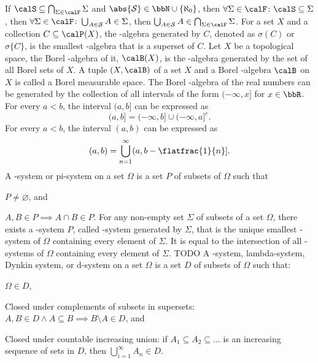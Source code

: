 \documentclass[a4paper,12pt]{article}
\begin{document}
If $\calS\subseteq\bigcap_{\Sigma\in\calF}\Sigma$ and $\abs{\mathcal{S}}\in\bbN\cup\{\aleph_0\}$, then $\forall\Sigma\in\calF\colon\calS\subseteq\Sigma$, then $\forall\Sigma\in\calF\colon\bigcup_{A\in\mathcal{S}}A\in\Sigma$, then $\bigcup_{A\in\mathcal{S}}A\in\bigcap_{\Sigma\in\calF}\Sigma$.
\epr
{}
For a set $X$ and a collection $C\subseteq \calP(X)$, the \text{\textsigma}-algebra generated by $C$, denoted as $\sigma(C)$ or $\sigma\{C\}$, is the smallest \text{\textsigma}-algebra that is a superset of $C$.
Let $X$ be a topological space, the Borel \text{\textsigma}-algebra of it, $\calB(X)$, is the \text{\textsigma}-algebra generated by the set of all Borel sets of $X$.
A tuple $(X,\calB)$ of a set $X$ and a Borel \text{\textsigma}-algebra $\calB$ on $X$ is called a Borel measurable space.
The Borel \text{\textsigma}-algebra of the real numbers can be generated by the collection of all intervals of the form $(-\infty,x]$ for $x\in\bbR$.
\bpr
For every $a<b$, the interval $(a,b]$ can be expressed as
\[(a,b]=(-\infty,b]\cup(-\infty,a]^c.\]
For every $a<b$, the interval $(a,b)$ can be expressed as
\[(a,b)=\bigcup_{n=1}^{\infty}(a,b-\flatfrac{1}{n}].\]
\epr
{}
A \textpi-system or pi-system on a set $\Omega$ is a set $P$ of subsets of $\Omega$ such that
\bit
\item $P\ne\varnothing$, and
\item $A,B\in P\implies A\cap B\in P$.
\eit
{}
For any non-empty set $\Sigma$ of subsets of a set $\Omega$, there exists a \textpi-system $P$, called \textpi-system generated by $\Sigma$, that is the unique smallest \textpi-system of $\Omega$ containing every element of $\Sigma$. It is equal to the intersection of all \textpi-systems of $\Omega$ containing every element of $\Sigma$.
\bpr
TODO
\epr
{}
A \textlambda-system, lambda-system, Dynkin system, or d-system on a set $\Omega$ is a set $D$ of subsets of $\Omega$ such that:
\bit
\item $\Omega\in D$,
\item Closed under complements of subsets in supersets: $A,B\in D\land A\subseteq B\implies B\setminus A\in D$, and
\item Closed under countable increasing union: if $A_1\subseteq A_2\subseteq\ldots$ is an increasing sequence of sets in $D$, then $\bigcup_{i=1}^{\infty}A_n\in D$.
\end{document}
